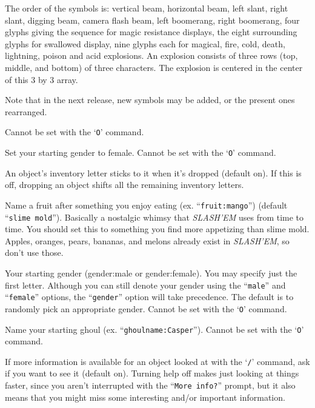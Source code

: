 The order of the symbols is:  vertical beam, horizontal beam, left slant,
right slant, digging beam, camera flash beam, left boomerang, right boomerang,
four glyphs giving the sequence for magic resistance displays,
the eight surrounding glyphs for swallowed display,
nine glyphs each for magical, fire, cold, death, lightning, poison and acid explosions.
An explosion consists of three rows (top, middle, and bottom) of three
characters.  The explosion is centered in the center of this 3 by 3
array.

Note that in the next release, new symbols may be added,
or the present ones rearranged.

Cannot be set with the `{\tt O}' command.

\item[\ib{female}]
Set your starting gender to female.
Cannot be set with the `{\tt O}' command.

\item[\ib{fixinv}]
An object's inventory letter sticks to it when it's dropped (default on).
If this is off, dropping an object shifts all the remaining inventory letters.

\item[\ib{fruit}]
Name a fruit after something you enjoy eating (ex. ``{\tt fruit:mango}'')
(default ``{\tt slime mold}'').  Basically a nostalgic whimsy that {\it SLASH'EM\/} uses
from time to time.  You should set this to something you find more
appetizing than slime mold.  Apples, oranges, pears, bananas, and melons
already exist in {\it SLASH'EM}, so don't use those.

\item[\ib{gender}]
Your starting gender (gender:male or gender:female).
You may specify just the first letter.  Although you can
still denote your gender using the ``{\tt male}'' and ``{\tt female}''
options, the ``{\tt gender}'' option will take precedence.
The default is to randomly pick an appropriate gender.
Cannot be set with the `{\tt O}' command.

\item[\ib{ghoulname}]
Name your starting ghoul (ex. ``{\tt ghoulname:Casper}'').
Cannot be set with the `{\tt O}' command.

\item[\ib{help}]
If more information is available for an object looked at
with the `{\tt /}' command, ask if you want to see it (default on). Turning help
off makes just looking at things faster, since you aren't interrupted with the
``{\tt More info?}'' prompt, but it also means that you might miss some
interesting and/or important information.

